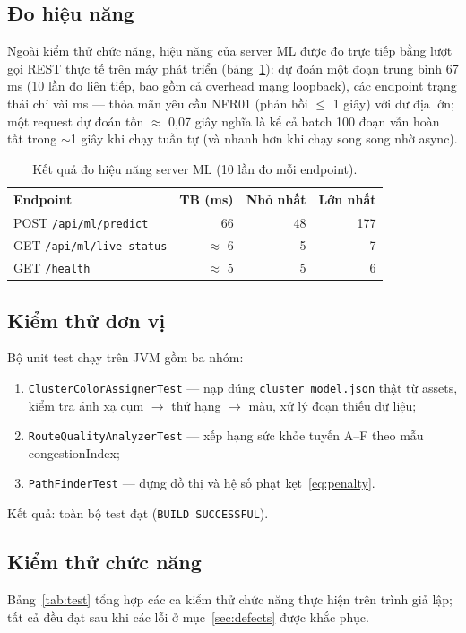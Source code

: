 \subsection{Đo hiệu năng}
Ngoài kiểm thử chức năng, hiệu năng của server ML được đo trực tiếp bằng lượt gọi REST thực tế trên máy phát triển (bảng~\ref{tab:perf}): dự đoán một đoạn trung bình 67 ms (10 lần đo liên tiếp, bao gồm cả overhead mạng loopback), các endpoint trạng thái chỉ vài ms --- thỏa mãn yêu cầu NFR01 (phản hồi $\le$ 1 giây) với dư địa lớn; một request dự đoán tốn $\approx$ 0,07 giây nghĩa là kể cả batch 100 đoạn vẫn hoàn tất trong $\sim$1 giây khi chạy tuần tự (và nhanh hơn khi chạy song song nhờ async).

\begin{table}[h!]
\centering
\caption{Kết quả đo hiệu năng server ML (10 lần đo mỗi endpoint).}
\label{tab:perf}
\small
\begin{tabular}{lrrr}
\toprule
\textbf{Endpoint} & \textbf{TB (ms)} & \textbf{Nhỏ nhất} & \textbf{Lớn nhất}\\
\midrule
POST \texttt{/api/ml/predict} & 66 & 48 & 177\\
GET \texttt{/api/ml/live-status} & $\approx$ 6 & 5 & 7\\
GET \texttt{/health} & $\approx$ 5 & 5 & 6\\
\bottomrule
\end{tabular}
\end{table}

\subsection{Kiểm thử đơn vị}
Bộ unit test chạy trên JVM gồm ba nhóm:
\begin{enumerate}[label=(\roman*),leftmargin=2.2cm,itemsep=2pt]
 \item \texttt{ClusterColorAssignerTest} --- nạp đúng \texttt{cluster\_model.json} thật từ assets, kiểm tra ánh xạ cụm $\rightarrow$ thứ hạng $\rightarrow$ màu, xử lý đoạn thiếu dữ liệu;
 \item \texttt{RouteQualityAnalyzerTest} --- xếp hạng sức khỏe tuyến A--F theo mẫu congestionIndex;
 \item \texttt{PathFinderTest} --- dựng đồ thị và hệ số phạt kẹt~\eqref{eq:penalty}.
\end{enumerate}
Kết quả: toàn bộ test đạt (\texttt{BUILD SUCCESSFUL}).

\subsection{Kiểm thử chức năng}
Bảng~\ref{tab:test} tổng hợp các ca kiểm thử chức năng thực hiện trên trình giả lập; tất cả đều đạt sau khi các lỗi ở mục~\ref{sec:defects} được khắc phục.


